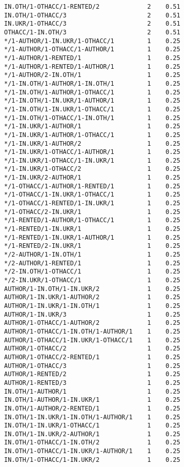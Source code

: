 \documentclass[
  letterpaper,
  DIV=11,
  numbers=noendperiod]{scrreprt}
\begin{document}
\begin{verbatim}
IN.OTH/1-OTHACC/1-RENTED/2             2    0.51
IN.OTH/1-OTHACC/3                      2    0.51
IN.UKR/1-OTHACC/3                      2    0.51
OTHACC/1-IN.OTH/3                      2    0.51
*/1-AUTHOR/1-IN.UKR/1-OTHACC/1         1    0.25
*/1-AUTHOR/1-OTHACC/1-AUTHOR/1         1    0.25
*/1-AUTHOR/1-RENTED/1                  1    0.25
*/1-AUTHOR/1-RENTED/1-AUTHOR/1         1    0.25
*/1-AUTHOR/2-IN.OTH/1                  1    0.25
*/1-IN.OTH/1-AUTHOR/1-IN.OTH/1         1    0.25
*/1-IN.OTH/1-AUTHOR/1-OTHACC/1         1    0.25
*/1-IN.OTH/1-IN.UKR/1-AUTHOR/1         1    0.25
*/1-IN.OTH/1-IN.UKR/1-OTHACC/1         1    0.25
*/1-IN.OTH/1-OTHACC/1-IN.OTH/1         1    0.25
*/1-IN.UKR/1-AUTHOR/1                  1    0.25
*/1-IN.UKR/1-AUTHOR/1-OTHACC/1         1    0.25
*/1-IN.UKR/1-AUTHOR/2                  1    0.25
*/1-IN.UKR/1-OTHACC/1-AUTHOR/1         1    0.25
*/1-IN.UKR/1-OTHACC/1-IN.UKR/1         1    0.25
*/1-IN.UKR/1-OTHACC/2                  1    0.25
*/1-IN.UKR/2-AUTHOR/1                  1    0.25
*/1-OTHACC/1-AUTHOR/1-RENTED/1         1    0.25
*/1-OTHACC/1-IN.UKR/1-OTHACC/1         1    0.25
*/1-OTHACC/1-RENTED/1-IN.UKR/1         1    0.25
*/1-OTHACC/2-IN.UKR/1                  1    0.25
*/1-RENTED/1-AUTHOR/1-OTHACC/1         1    0.25
*/1-RENTED/1-IN.UKR/1                  1    0.25
*/1-RENTED/1-IN.UKR/1-AUTHOR/1         1    0.25
*/1-RENTED/2-IN.UKR/1                  1    0.25
*/2-AUTHOR/1-IN.OTH/1                  1    0.25
*/2-AUTHOR/1-RENTED/1                  1    0.25
*/2-IN.OTH/1-OTHACC/1                  1    0.25
*/2-IN.UKR/1-OTHACC/1                  1    0.25
AUTHOR/1-IN.OTH/1-IN.UKR/2             1    0.25
AUTHOR/1-IN.UKR/1-AUTHOR/2             1    0.25
AUTHOR/1-IN.UKR/1-IN.OTH/1             1    0.25
AUTHOR/1-IN.UKR/3                      1    0.25
AUTHOR/1-OTHACC/1-AUTHOR/2             1    0.25
AUTHOR/1-OTHACC/1-IN.OTH/1-AUTHOR/1    1    0.25
AUTHOR/1-OTHACC/1-IN.UKR/1-OTHACC/1    1    0.25
AUTHOR/1-OTHACC/2                      1    0.25
AUTHOR/1-OTHACC/2-RENTED/1             1    0.25
AUTHOR/1-OTHACC/3                      1    0.25
AUTHOR/1-RENTED/2                      1    0.25
AUTHOR/1-RENTED/3                      1    0.25
IN.OTH/1-AUTHOR/1                      1    0.25
IN.OTH/1-AUTHOR/1-IN.UKR/1             1    0.25
IN.OTH/1-AUTHOR/2-RENTED/1             1    0.25
IN.OTH/1-IN.UKR/1-IN.OTH/1-AUTHOR/1    1    0.25
IN.OTH/1-IN.UKR/1-OTHACC/1             1    0.25
IN.OTH/1-IN.UKR/2-AUTHOR/1             1    0.25
IN.OTH/1-OTHACC/1-IN.OTH/2             1    0.25
IN.OTH/1-OTHACC/1-IN.UKR/1-AUTHOR/1    1    0.25
IN.OTH/1-OTHACC/1-IN.UKR/2             1    0.25

\end{verbatim}
\end{document}
